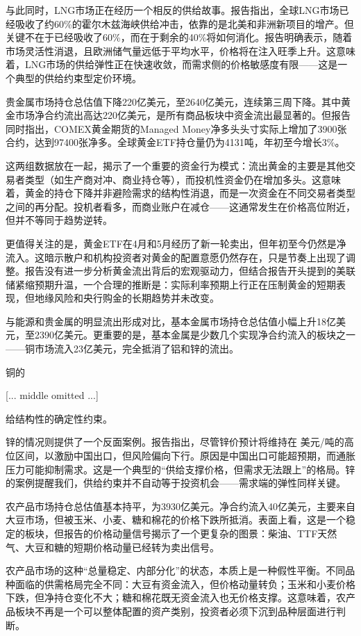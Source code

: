 \documentclass[11pt]{ctexart}
\begin{document}
与此同时，LNG市场正在经历一个相反的供给故事。报告指出，全球LNG市场已经吸收了约60\%的霍尔木兹海峡供给冲击，依靠的是北美和非洲新项目的增产。但关键不在于已经吸收了60\%，而在于剩余的40\%将如何消化。报告明确表示，随着市场灵活性消退，且欧洲储气量远低于平均水平，价格将在注入旺季上升。这意味着，LNG市场的供给弹性正在快速收敛，而需求侧的价格敏感度有限——这是一个典型的供给约束型定价环境。

贵金属市场持仓总估值下降220亿美元，至2640亿美元，连续第三周下降。其中黄金市场净合约流出高达220亿美元，是所有商品板块中资金流出最显著的。但报告同时指出，COMEX黄金期货的Managed Money净多头头寸实际上增加了3900张合约，达到97400张净多。全球黄金ETF持仓量仍为4131吨，年初至今增长3\%。

这两组数据放在一起，揭示了一个重要的资金行为模式：流出黄金的主要是其他交易者类型（如生产商对冲、商业持仓等），而投机性资金仍在增加多头。这意味着，黄金的持仓下降并非避险需求的结构性消退，而是一次资金在不同交易者类型之间的再分配。投机者看多，而商业账户在减仓——这通常发生在价格高位附近，但并不等同于趋势逆转。

更值得关注的是，黄金ETF在4月和5月经历了新一轮卖出，但年初至今仍然是净流入。这暗示散户和机构投资者对黄金的配置意愿仍然存在，只是节奏上出现了调整。报告没有进一步分析黄金流出背后的宏观驱动力，但结合报告开头提到的美联储紧缩预期升温，一个合理的推断是：实际利率预期上行正在压制黄金的短期表现，但地缘风险和央行购金的长期趋势并未改变。

与能源和贵金属的明显流出形成对比，基本金属市场持仓总估值小幅上升18亿美元，至2390亿美元。更重要的是，基本金属是少数几个实现净合约流入的板块之一——铜市场流入23亿美元，完全抵消了铝和锌的流出。

铜的

[... middle omitted ...]

给结构性的确定性约束。

锌的情况则提供了一个反面案例。报告指出，尽管锌价预计将维持在 美元/吨的高位区间，以激励中国出口，但风险偏向下行。原因是中国出口可能超预期，而通胀压力可能抑制需求。这是一个典型的“供给支撑价格，但需求无法跟上”的格局。锌的案例提醒我们，供给约束并不自动等于投资机会——需求端的弹性同样关键。

农产品市场持仓总估值基本持平，为3930亿美元。净合约流入40亿美元，主要来自大豆市场，但被玉米、小麦、糖和棉花的价格下跌所抵消。表面上看，这是一个稳定的板块，但报告的价格动量信号揭示了一个更复杂的图景：柴油、TTF天然气、大豆和糖的短期价格动量已经转为卖出信号。

农产品市场的这种“总量稳定、内部分化”的状态，本质上是一种假性平衡。不同品种面临的供需格局完全不同：大豆有资金流入，但价格动量转负；玉米和小麦价格下跌，但净持仓变化不大；糖和棉花既无资金流入也无价格支撑。这意味着，农产品板块不再是一个可以整体配置的资产类别，投资者必须下沉到品种层面进行判断。
\end{document}
